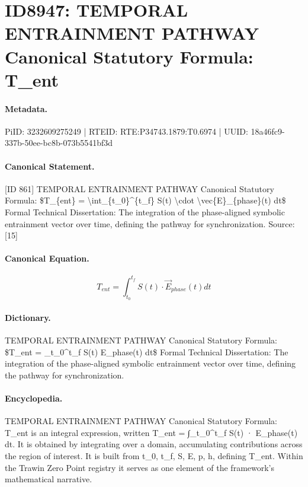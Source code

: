 \section*{ID8947: TEMPORAL ENTRAINMENT PATHWAY Canonical Statutory Formula: T\_ent}
\paragraph{Metadata.}
PiID: 3232609275249 | RTEID: RTE:P34743.1879:T0.6974 | UUID: 18a46fc9-337b-50ee-bc8b-073b5541bf3d

\paragraph{Canonical Statement.}
[ID 861] TEMPORAL ENTRAINMENT PATHWAY Canonical Statutory Formula: \$T\_\{ent\} = \textbackslash{}int\_\{t\_0\}\textasciicircum{}\{t\_f\} S(t) \textbackslash{}cdot \textbackslash{}vec\{E\}\_\{phase\}(t) dt\$ Formal Technical Dissertation: The integration of the phase-aligned symbolic entrainment vector over time, defining the pathway for synchronization. Source: [15]

\paragraph{Canonical Equation.}
\[
T_{ent} = \int_{t_0}^{t_f} S(t) \cdot \vec{E}_{phase}(t) dt
\]

\paragraph{Dictionary.}
TEMPORAL ENTRAINMENT PATHWAY Canonical Statutory Formula: \$T\_ent = \_t\_0\textasciicircum{}t\_f S(t) E\_phase(t) dt\$ Formal Technical Dissertation: The integration of the phase-aligned symbolic entrainment vector over time, defining the pathway for synchronization.

\paragraph{Encyclopedia.}
TEMPORAL ENTRAINMENT PATHWAY Canonical Statutory Formula: T\_ent is an integral expression, written T\_ent = ∫\_t\_0\textasciicircum{}t\_f S(t) · E\_phase(t) dt. It is obtained by integrating over a domain, accumulating contributions across the region of interest. It is built from t\_0, t\_f, S, E, p, h, defining T\_ent. Within the Trawin Zero Point registry it serves as one element of the framework's mathematical narrative.
